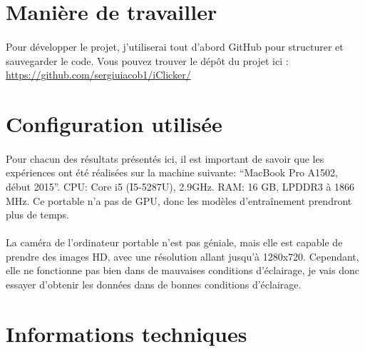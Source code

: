 \section{Manière de travailler}
\paragraph{}
Pour développer le projet, j'utiliserai tout d'abord GitHub pour structurer et sauvegarder le code.
Vous pouvez trouver le dépôt du projet ici : \href{https://github.com/sergiuiacob1/iClicker/}{https://github.com/sergiuiacob1/iClicker/}

\section{Configuration utilisée}
\paragraph{}
Pour chacun des résultats présentés ici, il est important de savoir que les expériences ont été réalisées sur la machine suivante: ``MacBook Pro A1502, début 2015''.
CPU: Core i5 (I5-5287U), 2.9GHz. RAM: 16 GB, LPDDR3 à 1866 MHz.
Ce portable n'a pas de GPU, donc les modèles d'entraînement prendront plus de temps.
\paragraph{}
La caméra de l'ordinateur portable n'est pas géniale, mais elle est capable de prendre des images HD, avec une résolution allant jusqu'à 1280x720.
Cependant, elle ne fonctionne pas bien dans de mauvaises conditions d'éclairage, je vais donc essayer d'obtenir les données dans de bonnes conditions d'éclairage.

\section{Informations techniques}
